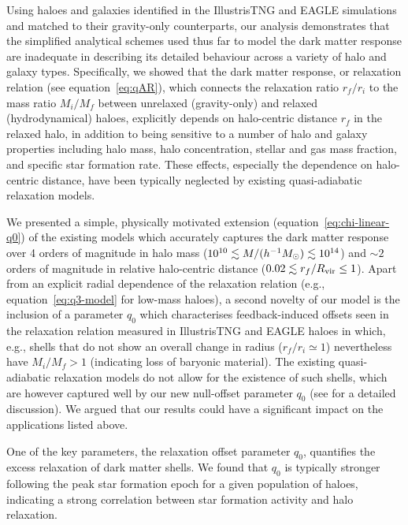 Using haloes and galaxies identified in the IllustrisTNG and EAGLE simulations and matched to their gravity-only counterparts, our analysis demonstrates that the simplified analytical schemes used thus far to model the dark matter response \citep[e.g.,][]{1986ApJ...301...27B,2010MNRAS.407..435A,2015JCAP...12..049S} are inadequate in describing its detailed behaviour across a variety of halo and galaxy types. Specifically, we showed that the dark matter response, or relaxation relation (see equation~\ref{eq:qAR}), which connects the relaxation ratio $r_f/r_i$ to the mass ratio $M_i/M_f$ between unrelaxed (gravity-only) and relaxed (hydrodynamical) haloes, explicitly depends on halo-centric distance $r_f$ in the relaxed halo, in addition to being sensitive to a number of halo and galaxy properties including halo mass, halo concentration, stellar and gas mass fraction, and specific star formation rate. These effects, especially the dependence on halo-centric distance, have been typically neglected by existing quasi-adiabatic relaxation models. 

We presented a simple, physically motivated extension (equation~\ref{eq:chi-linear-q0}) of the existing models which accurately captures the dark matter response over 4 orders of magnitude in halo mass ($10^{10}\lesssim M/(h^{-1}M_{\odot})\lesssim 10^{14}$) and $\sim2$ orders of magnitude in relative halo-centric distance ($0.02\lesssim r_f/R_{\rm vir}\leq1$). Apart from an explicit radial dependence of the relaxation relation (e.g., equation~\ref{eq:q3-model} for low-mass haloes), a second novelty of our model is the inclusion of a parameter $q_0$ which characterises feedback-induced offsets seen in the relaxation relation measured in IllustrisTNG and EAGLE haloes in which, e.g., shells that do not show an overall change in radius ($r_f/r_i\simeq1$) nevertheless have $M_i/M_f>1$ (indicating loss of baryonic material). The existing quasi-adiabatic relaxation models do not allow for the existence of such shells, which are however captured well by our new null-offset parameter $q_0$ (see  for a detailed discussion).
We argued that our results could have a significant impact on the applications listed above.

One of the key parameters, the relaxation offset parameter \( q_0 \), quantifies the excess relaxation of dark matter shells. We found that \( q_0 \) is typically stronger following the peak star formation epoch for a given population of haloes, indicating a strong correlation between star formation activity and halo relaxation.


